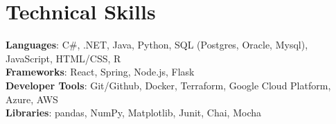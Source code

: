 \documentclass[letterpaper,11pt]{article}
\begin{document}
%
\section{Technical Skills}
 \begin{itemize}[leftmargin=0.15in, label={}]
    \small{\item{
     \textbf{Languages}{: C\#, .NET, Java, Python, SQL (Postgres, Oracle, Mysql), JavaScript, HTML/CSS, R} \\
     \textbf{Frameworks}{: React, Spring, Node.js, Flask} \\
     \textbf{Developer Tools}{: Git/Github, Docker, Terraform, Google Cloud Platform, Azure, AWS} \\
     \textbf{Libraries}{: pandas, NumPy, Matplotlib, Junit, Chai, Mocha}
    }}
 \end{itemize}


\end{document}
